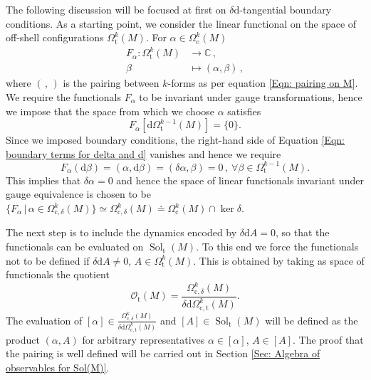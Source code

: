 The following discussion will be focused at first on $\delta\mathrm{d}$-tangential boundary conditions.
As a starting point, we consider the linear functional on the space of off-shell configurations $\Omega_{\mathrm{t}}^k(M)$. For $\alpha\in\Omega_{\mathrm{c}}^k(M)$
\begin{align}
F_\alpha:\Omega_{\mathrm{t}}^k(M)&\longrightarrow \mathbb{C}\,,\\
\beta&\longmapsto(\alpha,\beta)\,,
\end{align}
where $(\,,\,)$ is the pairing between $k$-forms as per equation \eqref{Eqn: pairing on M}.
We require the functionals $F_\alpha$ to be invariant under gauge transformations, hence we impose that the space from which we choose $\alpha$ satisfies
\begin{equation*}
F_\alpha\left[\mathrm{d}\Omega_{\mathrm{t}}^{k-1}(M)\right]=\{0\}.
\end{equation*}
Since we imposed boundary conditions, the right-hand side of Equation \eqref{Eqn: boundary terms for delta and d} vanishes and hence we require
\[	F_\alpha(\mathrm{d}\beta)	=(\alpha,\mathrm{d}\beta)=(\delta\alpha,\beta)=0\,,\ \forall \beta\in\Omega_{\mathrm{t}}^{k-1}(M).	\]
This implies that $\delta\alpha=0$ and hence the space of linear functionals invariant under gauge equivalence is chosen to be $\{F_\alpha\,|\,\alpha\in\Omega_{\mathrm{c},\delta}^k(M)\}\simeq\Omega_{\mathrm{c},\delta}^k(M)\doteq \Omega_{\mathrm{c}}^k(M)\cap\ker\delta$.

The next step is to include the dynamics encoded by $\delta\mathrm{d}A=0$, so that the functionals can be evaluated on $\operatorname{Sol}_{\mathrm{t}}(M)$. To this end we force the functionals not to be defined if $\delta\mathrm{d}A\neq 0$, $A\in\Omega_{\mathrm{t}}^k(M)$. This is obtained by taking as space of functionals the quotient
\begin{equation}\label{Eqn: functionals tangential}
\mathcal{O}_{\mathrm{t}}(M)=\frac{\Omega_{\mathrm{c},\delta}^k(M)}{\delta\mathrm{d}\Omega_{\mathrm{c,t}}^k(M)}.
\end{equation}
The evaluation of $[\alpha]\in\frac{\Omega_{\mathrm{c},\delta}^k(M)}{\delta\mathrm{d}\Omega_{\mathrm{c,t}}^k(M)}$ and $[A]\in\operatorname{Sol}_{\mathrm{t}}(M)$ will be defined as the product $(\alpha,A)$ for arbitrary representatives $\alpha\in[\alpha]$, $A\in[A]$. The proof that the pairing is well defined will be carried out in Section \ref{Sec: Algebra of observables for Sol(M)}.\\

